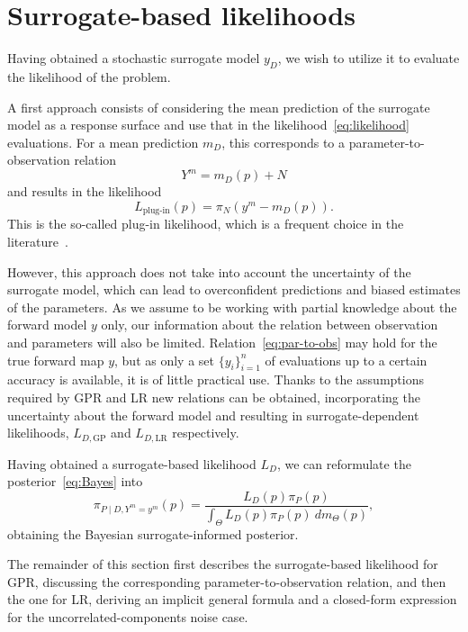 \section{Surrogate-based likelihoods}\label{sec:likelihoods}

Having obtained a stochastic surrogate model $y_D$, we wish to utilize it to evaluate the likelihood of the problem.

A first approach consists of considering the mean prediction of the surrogate model as a response surface and use that in the likelihood~\eqref{eq:likelihood} evaluations. 
For a mean prediction $m_D$, this corresponds to a parameter-to-observation relation 
\begin{equation}\label{eq:plug-in-par-to-obs}
    Y^m = m_D(p) + N
\end{equation}
and results in the likelihood
\begin{equation}\label{eq:plug-in-likelihood}
    L_{\text{plug-in}}(p) = \pi_N(y^m - m_D(p)).
\end{equation}
This is the so-called plug-in likelihood, which is a frequent choice in the literature~\cite{SinsbeckNowak2017}. 

However, this approach does not take into account the uncertainty of the surrogate model, which can lead to overconfident predictions and biased estimates of the parameters.
As we assume to be working with partial knowledge about the forward model $y$ only, our information about the relation between observation and parameters will also be limited. 
Relation~\eqref{eq:par-to-obs} may hold for the true forward map $y$, but as only a set $\{y_i\}_{i=1}^n$ of evaluations up to a certain accuracy is available, it is of little practical use. 
Thanks to the assumptions required by GPR and LR new relations can be obtained, incorporating the uncertainty about the forward model and resulting in surrogate-dependent likelihoods, $L_{D, \text{GP}}$ and $L_{D, \text{LR}}$ respectively. 

Having obtained a surrogate-based likelihood $L_D$, we can reformulate the posterior~\eqref{eq:Bayes} into 
\begin{equation} \label{eq:surr-posterior}
    \pi_{P\mid D, Y^m = y^m}(p) = \frac{L_D(p) \pi_P(p)}{\int_\Theta  L_D(p) \pi_P(p) \ dm_\Theta(p)},
\end{equation}
obtaining the Bayesian surrogate-informed posterior.

The remainder of this section first describes the surrogate-based likelihood for GPR, discussing the corresponding parameter-to-observation relation, and then the one for LR, deriving an implicit general formula and a closed-form expression for the uncorrelated-components noise case.

